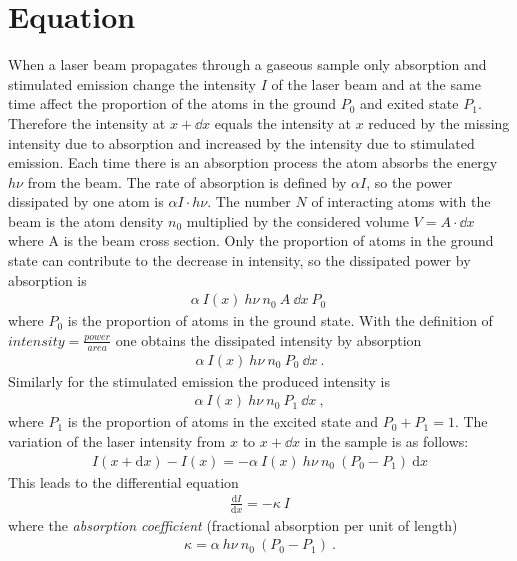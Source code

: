 \section{Equation} %
When a laser beam propagates through a gaseous sample only absorption and stimulated
emission change the intensity \(I\) of the laser beam and at the same time affect 
the proportion of the atoms in the ground \(P_0\) and exited state \(P_1\). 
Therefore the intensity at \(x+\dd x\) equals the intensity at \(x\) reduced by 
the missing intensity due to absorption and increased by the intensity due to 
stimulated emission. Each time there is an absorption process the atom absorbs 
the energy \(h\nu \) from the beam. The rate of absorption is defined by 
\(\alpha I \), so the power dissipated by one atom is \(\alpha I \cdot h\nu \). The number \(N\) of interacting
atoms with the beam is the atom density \(n_0\) multiplied by the considered volume
\(V = A \cdot \dd x \) where A is the beam cross section. Only the proportion of atoms in the 
ground state can contribute to the decrease in intensity, so the dissipated power
by absorption is
\begin{align}
    \alpha~I(x) ~ h\nu ~ n_0 ~ A ~ \dd x ~ P_0 ~ 
\end{align}
where \(P_0\) is the proportion of atoms in the ground state.
With the definition of \( intensity = \frac{power}{area}\) one obtains the dissipated
intensity by absorption 
\begin{align}
    \alpha~I(x) ~ h\nu ~ n_0 ~ P_0 ~ \dd x ~. 
\end{align}
Similarly for the stimulated emission the produced intensity is
\begin{align}
    \alpha~I(x) ~ h\nu ~ n_0 ~ P_1 ~ \dd x ~, 
\end{align}
where \(P_1\) is the proportion of atoms in the excited state and \(P_0+P_1 = 1\).
The variation of the laser intensity from \(x\) to
\(x+\dd x\) in the sample is as follows:
\begin{align} \label{eq:Int}
    I(x+\mathrm{d}x)-I(x) = - \alpha~I(x) ~ h\nu ~ n_0 ~ (P_0-P_1)~\mathrm{d}x 
\end{align}
This leads to the differential equation
\begin{align}\label{eq:diff_eq}
    \frac{ \mathrm{d}I }{ \mathrm{d}x } = -\kappa ~ I
\end{align}
where the \textit{absorption coefficient} (fractional absorption per unit of length)
\begin{align}\label{eq:kappa}
    \kappa = \alpha ~ h\nu  ~ n_0 ~ (P_0-P_1)~.
\end{align}

